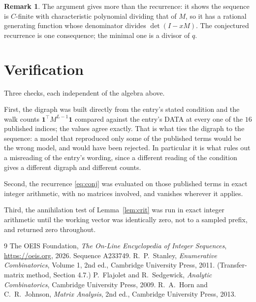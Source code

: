 \documentclass[11pt,a4paper]{article}
\theoremstyle{plain}
\theoremstyle{definition}
\newtheorem{remark}[theorem]{Remark}
\begin{document}
\begin{remark}
The argument gives more than the recurrence: it shows the sequence is $C$-finite with
characteristic polynomial dividing that of $M$, so it has a rational generating function
whose denominator divides $\det(I-xM)$. The conjectured recurrence is one consequence; the
minimal one is a divisor of $q$.
\end{remark}

\section{Verification}

Three checks, each independent of the algebra above.

First, the digraph was built directly from the entry's stated condition and the walk counts
$\mathbf{1}^{\!\top}M^{L-1}\mathbf{1}$ compared against the entry's DATA at
every one of the $16$ published indices; the values agree exactly. That is what ties
the digraph to the sequence: a model that reproduced only some of the published terms would
be the wrong model, and would have been rejected. In particular it is what rules out a
misreading of the entry's wording, since a different reading of the condition gives a
different digraph and different counts.

Second, the recurrence \eqref{eq:conj} was evaluated on those published terms in exact
integer arithmetic, with no matrices involved, and vanishes wherever it applies.

Third, the annihilation test of Lemma~\ref{lem:crit} was run in exact integer arithmetic
until the working vector was identically zero, not to a sampled prefix, and returned zero
throughout.

\begin{thebibliography}{9}
 The OEIS Foundation, \emph{The On-Line Encyclopedia of Integer
Sequences}, \url{https://oeis.org}, 2026. Sequence A233749.
 R.~P.~Stanley, \emph{Enumerative Combinatorics}, Volume 1, 2nd ed.,
Cambridge University Press, 2011. (Transfer-matrix method, Section 4.7.)
 P.~Flajolet and R.~Sedgewick, \emph{Analytic Combinatorics}, Cambridge
University Press, 2009.
 R.~A.~Horn and C.~R.~Johnson, \emph{Matrix Analysis}, 2nd ed., Cambridge
University Press, 2013.
\end{thebibliography}
\end{document}
